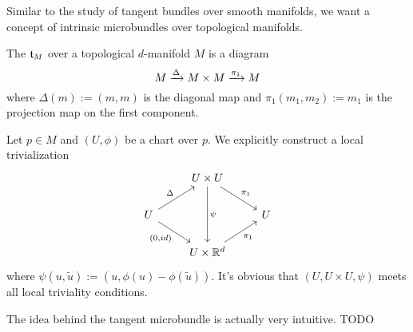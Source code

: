 Similar to the study of tangent bundles over smooth manifolds,
we want a concept of intrinsic microbundles over topological manifolds.

\begin{myexample}
    The  $\bt_M$ over a topological $d$-manifold $M$ is a diagram
    \[ M \xrightarrow{\Delta} M \times M \xrightarrow{\pi_1} M{} \]
    where $\Delta(m) := (m, m)$ is the diagonal map and $\pi_1(m_1, m_2) := m_1$ is the projection map on the first component.
    \begin{myproof}[$\bt_M$ is a microbundle]
        Let $p \in M$ and $(U, \phi)$ be a chart over $p$.
        We explicitly construct a local trivialization
        \[\begin{tikzcd}
            & U \times U \ar[dr, "\pi_1"] \ar[dd, "{\psi}"] & \\
            U \ar[ur, "\Delta"] \ar[dr, "{(0, id)}"'] & & U \\
            & U \times \R^d \ar[ur, "\pi_1"'] &
        \end{tikzcd}\]
        where $\psi(u, \tilde{u}) := (u, \phi(u) - \phi(\tilde{u}))$.
        It's obvious that $(U, U \times U, \psi)$ meets all local triviality conditions.
    \end{myproof}
\end{myexample}

The idea behind the tangent microbundle is actually very intuitive.
TODO